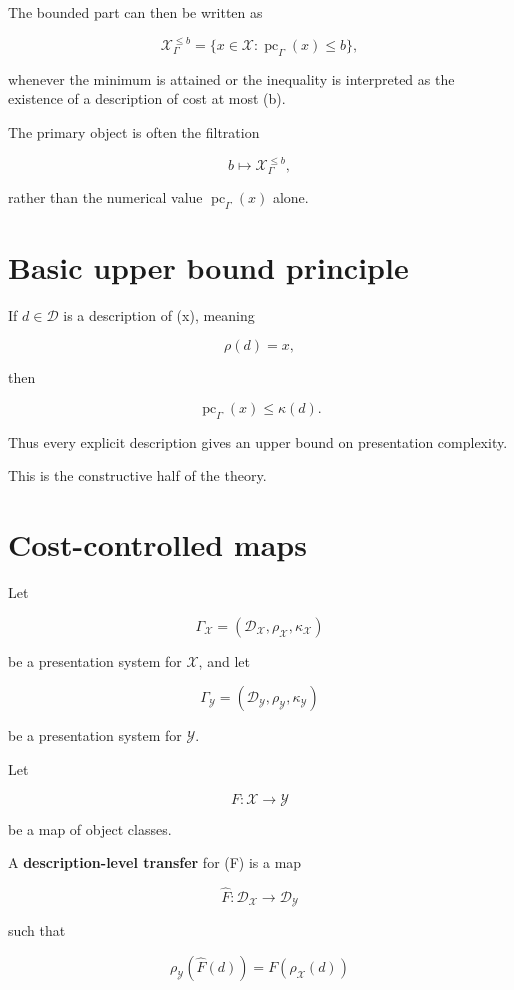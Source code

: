 \documentclass[11pt]{article}
\begin{document}
The bounded part can then be written as

\[
\mathcal X_\Gamma^{\leq b}=\{x\in\mathcal X:\operatorname{pc}_\Gamma(x)\leq b\},
\]

whenever the minimum is attained or the inequality is interpreted as the existence of a description of cost at most (b).

The primary object is often the filtration

\[
b\mapsto \mathcal X_\Gamma^{\leq b},
\]

rather than the numerical value \(\operatorname{pc}_\Gamma(x)\) alone.


\section{Basic upper bound principle}

If \(d\in\mathcal D\) is a description of (x), meaning

\[
\rho(d)=x,
\]

then

\[
\operatorname{pc}_\Gamma(x)\leq \kappa(d).
\]

Thus every explicit description gives an upper bound on presentation complexity.

This is the constructive half of the theory.


\section{Cost-controlled maps}

Let

\[
\Gamma_\mathcal X=(\mathcal D_\mathcal X,\rho_\mathcal X,\kappa_\mathcal X)
\]

be a presentation system for \(\mathcal X\), and let

\[
\Gamma_\mathcal Y=(\mathcal D_\mathcal Y,\rho_\mathcal Y,\kappa_\mathcal Y)
\]

be a presentation system for \(\mathcal Y\).

Let

\[
F:\mathcal X\to\mathcal Y
\]

be a map of object classes.

A \textbf{description-level transfer} for (F) is a map

\[
\widehat F:\mathcal D_\mathcal X\to\mathcal D_\mathcal Y
\]

such that

\[
\rho_\mathcal Y(\widehat F(d))=F(\rho_\mathcal X(d))
\]
\end{document}
